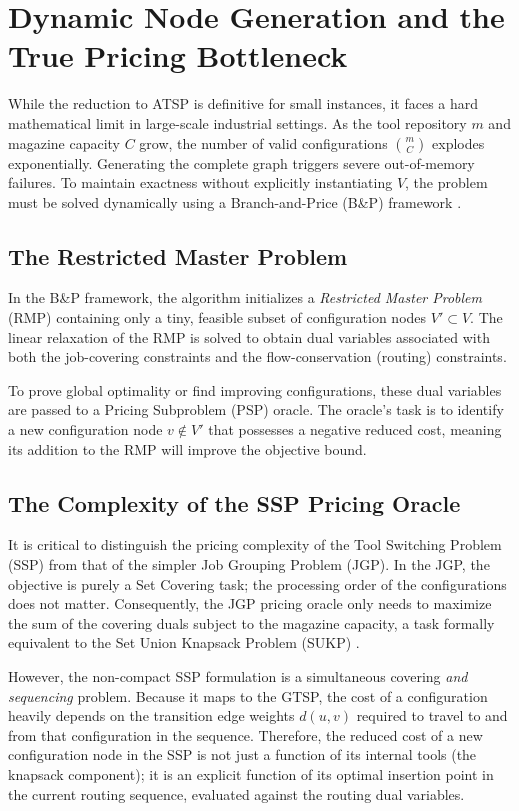 \documentclass[12pt]{article}
\begin{document}
	
	\section{Dynamic Node Generation and the True Pricing Bottleneck}
	
	While the reduction to ATSP is definitive for small instances, it faces a hard mathematical limit in large-scale industrial settings. As the tool repository $m$ and magazine capacity $C$ grow, the number of valid configurations $\binom{m}{C}$ explodes exponentially. Generating the complete graph triggers severe out-of-memory failures. To maintain exactness without explicitly instantiating $V$, the problem must be solved dynamically using a Branch-and-Price (B\&P) framework \parencite{Barnhart1998}.
	
	\subsection{The Restricted Master Problem}
	In the B\&P framework, the algorithm initializes a \textit{Restricted Master Problem} (RMP) containing only a tiny, feasible subset of configuration nodes $V' \subset V$. The linear relaxation of the RMP is solved to obtain dual variables associated with both the job-covering constraints and the flow-conservation (routing) constraints.
	
	To prove global optimality or find improving configurations, these dual variables are passed to a Pricing Subproblem (PSP) oracle. The oracle's task is to identify a new configuration node $v \notin V'$ that possesses a negative reduced cost, meaning its addition to the RMP will improve the objective bound. 
	
	\subsection{The Complexity of the SSP Pricing Oracle}
	It is critical to distinguish the pricing complexity of the Tool Switching Problem (SSP) from that of the simpler Job Grouping Problem (JGP). In the JGP, the objective is purely a Set Covering task; the processing order of the configurations does not matter. Consequently, the JGP pricing oracle only needs to maximize the sum of the covering duals subject to the magazine capacity, a task formally equivalent to the Set Union Knapsack Problem (SUKP) \parencite{Crama1994}.
	
	However, the non-compact SSP formulation is a simultaneous covering \textit{and sequencing} problem. Because it maps to the GTSP, the cost of a configuration heavily depends on the transition edge weights $d(u,v)$ required to travel to and from that configuration in the sequence. Therefore, the reduced cost of a new configuration node in the SSP is not just a function of its internal tools (the knapsack component); it is an explicit function of its optimal insertion point in the current routing sequence, evaluated against the routing dual variables.
	
\end{document}
